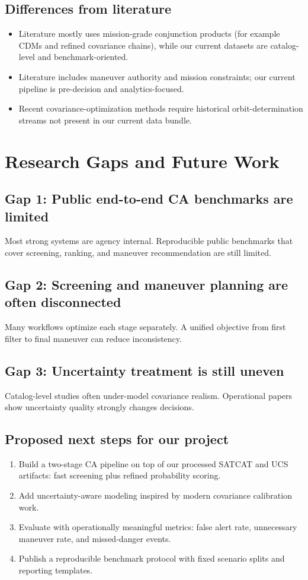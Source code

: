 \documentclass[11pt]{article}
\begin{document}
\subsection*{Differences from literature}
\begin{itemize}[noitemsep]
    \item Literature mostly uses mission-grade conjunction products (for example CDMs and refined covariance chains), while our current datasets are catalog-level and benchmark-oriented.
    \item Literature includes maneuver authority and mission constraints; our current pipeline is pre-decision and analytics-focused.
    \item Recent covariance-optimization methods require historical orbit-determination streams not present in our current data bundle.
\end{itemize}

\section*{Research Gaps and Future Work}

\subsection*{Gap 1: Public end-to-end CA benchmarks are limited}
Most strong systems are agency internal. Reproducible public benchmarks that cover screening, ranking, and maneuver recommendation are still limited.

\subsection*{Gap 2: Screening and maneuver planning are often disconnected}
Many workflows optimize each stage separately. A unified objective from first filter to final maneuver can reduce inconsistency.

\subsection*{Gap 3: Uncertainty treatment is still uneven}
Catalog-level studies often under-model covariance realism. Operational papers show uncertainty quality strongly changes decisions.

\subsection*{Proposed next steps for our project}
\begin{enumerate}[noitemsep]
    \item Build a two-stage CA pipeline on top of our processed SATCAT and UCS artifacts: fast screening plus refined probability scoring.
    \item Add uncertainty-aware modeling inspired by modern covariance calibration work.
    \item Evaluate with operationally meaningful metrics: false alert rate, unnecessary maneuver rate, and missed-danger events.
    \item Publish a reproducible benchmark protocol with fixed scenario splits and reporting templates.
\end{enumerate}
\end{document}
